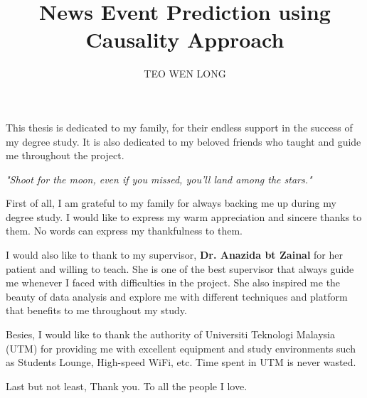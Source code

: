 \documentclass[twoside]{utmthesis}
\begin{document}
\title{News Event Prediction using Causality Approach}

\author{TEO WEN LONG}


\coverpage
\superpage
\frontmatter
\maketitle
\declaration

\begin{dedication}
This thesis is dedicated to my family, for their endless support in the success of my degree study. It is also dedicated to my beloved friends who taught and guide me throughout the project.

\textit{"Shoot for the moon, even if you missed, you'll land among the stars."} 
\end{dedication}

\begin{acknowledgement}
First of all, I am grateful to my family for always backing me up during my degree study. I would like to express my warm appreciation and sincere thanks to them. No words can express my thankfulness to them.

I would also like to thank to my supervisor, \textbf{Dr. Anazida bt Zainal} for her patient and willing to teach. She is one of the best supervisor that always guide me whenever I faced with difficulties in the project. She also inspired me the beauty of data analysis and explore me with different techniques and platform that benefits to me throughout my study. 

Besies, I would like to thank the authority of Universiti Teknologi Malaysia (UTM) for providing me with excellent equipment and study environments such as Students Lounge, High-speed WiFi, etc. Time spent in UTM is never wasted. 

Last but not least, Thank you. To all the people I love.   
\end{acknowledgement}
\end{document}
